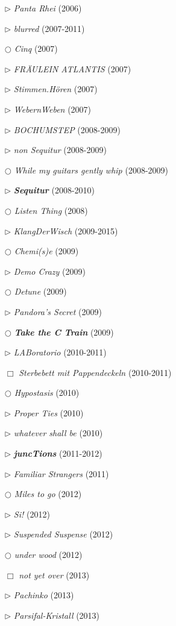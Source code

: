 \documentclass[a4paper,12pt]{article}
\begin{document}
\begin{itemize}
\item[$\rhd$] \emph{Panta Rhei} (2006)
\item[$\rhd$] \emph{blurred} (2007-2011)
\item[$\bigcirc$] \emph{Cinq} (2007)
\item[$\rhd$] \emph{FRÄULEIN ATLANTIS} (2007)
\item[$\rhd$] \emph{Stimmen.Hören} (2007)
\item[$\rhd$] \emph{WebernWeben} (2007)
\item[$\rhd$] \emph{BOCHUMSTEP} (2008-2009)
\item[$\rhd$] \emph{non Sequitur} (2008-2009)
\item[$\bigcirc$] \emph{While my guitars gently whip} (2008-2009)
\item[$\rhd$] \textbf{\emph{Sequitur}} (2008-2010)
\item[$\bigcirc$] \emph{Listen Thing} (2008)
\item[$\rhd$] \emph{KlangDerWisch} (2009-2015)
\item[$\bigcirc$] \emph{Chemi(s)e} (2009)
\item[$\rhd$] \emph{Demo Crazy} (2009)
\item[$\bigcirc$] \emph{Detune} (2009)
\item[$\rhd$] \emph{Pandora's Secret} (2009)
\item[$\bigcirc$] \textbf{\emph{Take the C Train}} (2009)
\item[$\rhd$] \emph{LABoratorio} (2010-2011)
\item[$\Box$] \emph{Sterbebett mit Pappendeckeln} (2010-2011)
\item[$\bigcirc$] \emph{Hypostasis} (2010)
\item[$\rhd$] \emph{Proper Ties} (2010)
\item[$\rhd$] \emph{whatever shall be} (2010)
\item[$\rhd$] \textbf{\emph{juncTions}} (2011-2012)
\item[$\rhd$] \emph{Familiar Strangers} (2011)
\item[$\bigcirc$] \emph{Miles to go} (2012)
\item[$\rhd$] \emph{Si!} (2012)
\item[$\rhd$] \emph{Suspended Suspense} (2012)
\item[$\bigcirc$] \emph{under wood} (2012)
\item[$\Box$] \emph{not yet over} (2013)
\item[$\rhd$] \emph{Pachinko} (2013)
\item[$\rhd$] \emph{Parsifal-Kristall} (2013)

\end{itemize}
\end{document}

